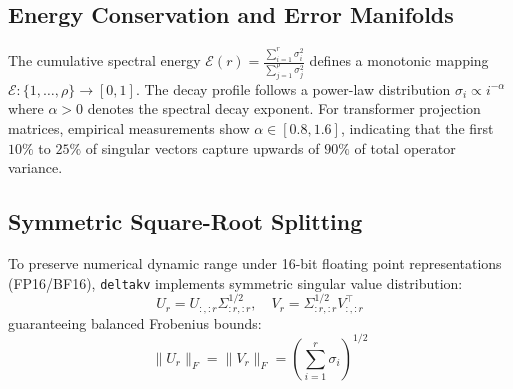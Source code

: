\subsection{Energy Conservation and Error Manifolds}
The cumulative spectral energy $\mathcal{E}(r) = \frac{\sum_{i=1}^r \sigma_i^2}{\sum_{j=1}^\rho \sigma_j^2}$ defines a monotonic mapping $\mathcal{E}: \{1, \dots, \rho\} \to [0, 1]$. The decay profile follows a power-law distribution $\sigma_i \propto i^{-\alpha}$ where $\alpha > 0$ denotes the spectral decay exponent. For transformer projection matrices, empirical measurements show $\alpha \in [0.8, 1.6]$, indicating that the first $10\%$ to $25\%$ of singular vectors capture upwards of $90\%$ of total operator variance.

\subsection{Symmetric Square-Root Splitting}
To preserve numerical dynamic range under 16-bit floating point representations (FP16/BF16), \texttt{deltakv} implements symmetric singular value distribution:
\[
U_r = U_{:, :r} \Sigma_{:r, :r}^{1/2}, \quad V_r = \Sigma_{:r, :r}^{1/2} V_{:, :r}^\top
\]
guaranteeing balanced Frobenius bounds:
\[
\|U_r\|_F = \|V_r\|_F = \left( \sum_{i=1}^{r} \sigma_i \right)^{1/2}
\]
